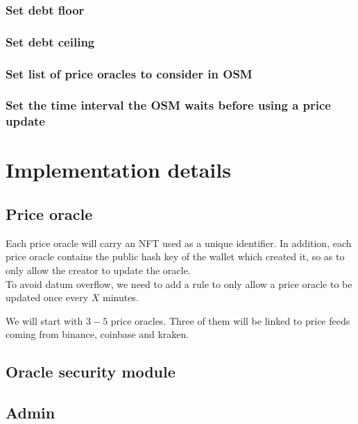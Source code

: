 \documentclass{article} %
\begin{document}
\subsubsection{Set debt floor}

\subsubsection{Set debt ceiling}

\subsubsection{Set list of price oracles to consider in OSM}

\subsubsection{Set the time interval the OSM waits before using a price update}


\section{Implementation details}


\subsection{Price oracle}

Each price oracle will carry an NFT used as a unique identifier.
In addition, each price oracle contains the public hash key of the wallet which
created it, so as to only allow the creator to update the oracle. \\

To avoid datum overflow, we need to add a rule to only allow a price oracle to
be updated once every $X$ minutes.

We will start with $3-5$ price oracles.
Three of them will be linked to price feeds coming from binance, coinbase and
kraken.

\subsection{Oracle security module}

\subsection{Admin}
\end{document}
